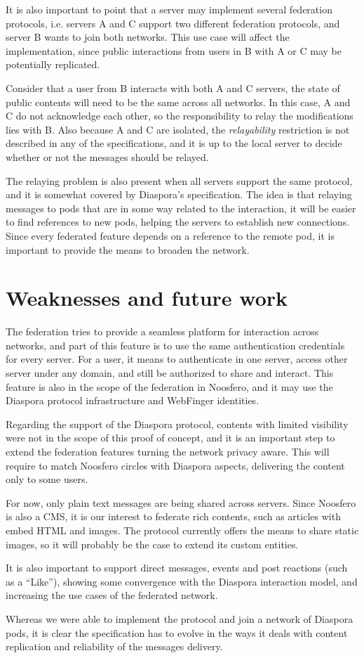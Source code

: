 It is also important to point that a server may implement several federation
protocols, i.e. servers A and C support two different federation protocols,
and server B wants to join both networks. This use case will affect the
implementation, since public interactions from users in B with A or C may be
potentially replicated.

Consider that a user from B interacts with both A and C servers, the
state of public contents will need to be the same across all networks.
In this case, A and C do not acknowledge each other, so the responsibility
to relay the modifications lies with B. Also because A and C are isolated,
the \textit{relayability} restriction is not described in any of the
specifications, and it is up to the local server to decide whether or not
the messages should be relayed.

The relaying problem is also present when all servers support the
same protocol, and it is somewhat covered by Diaspora's specification.
The idea is that relaying messages to pods that are in some way related
to the interaction, it will be easier to find references to new pods,
helping the servers to establish new connections. Since every federated
feature depends on a reference to the remote pod, it is important to
provide the means to broaden the network.


\section{Weaknesses and future work}

The federation tries to provide a seamless platform for interaction across
networks, and part of this feature is to use the same authentication
credentials for every server. For a user, it means to authenticate in one
server, access other server under any domain, and still be authorized
to share and interact. This feature is also in the scope of the federation
in Noosfero, and it may use the Diaspora protocol infrastructure and WebFinger
identities.

Regarding the support of the Diaspora protocol, contents with limited
visibility were not in the scope of this proof of concept, and it is an
important step to extend the federation features turning the network privacy
aware. This will require to match Noosfero circles with Diaspora aspects,
delivering the content only to some users.

For now, only plain text messages are being shared across servers. Since
Noosfero is also a CMS, it is our interest to federate rich contents,
such as articles with embed HTML and images. The protocol currently offers
the means to share static images, so it will probably be the case to extend
its custom entities.

It is also important to support direct messages, events and post reactions
(such as a ``Like''), showing some convergence with the Diaspora interaction
model, and increasing the use cases of the federated network.

Whereas we were able to implement the protocol and join a network of Diaspora
pods, it is clear the specification has to evolve in the ways it deals with
content replication and reliability of the messages delivery.

